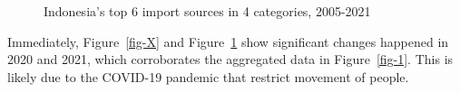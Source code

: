 \documentclass[
  letterpaper,
  DIV=11,
  numbers=noendperiod]{scrartcl}
\begin{document}
\begin{figure}
\begin{minipage}{0.50\linewidth}


\end{minipage}%
%
\begin{minipage}{0.50\linewidth}



\end{minipage}%

\caption{\label{fig-M}Indonesia's top 6 import sources in 4 categories,
2005-2021}

\end{figure}%

Immediately, Figure~\ref{fig-X} and Figure~\ref{fig-M} show significant
changes happened in 2020 and 2021, which corroborates the aggregated
data in Figure~\ref{fig-1}. This is likely due to the COVID-19 pandemic
that restrict movement of people.
\end{document}
